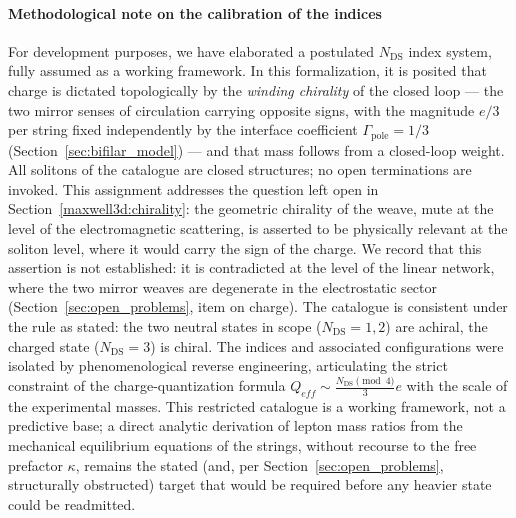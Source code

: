 \documentclass[11pt,a4paper]{article}
\theoremstyle{plain}
\theoremstyle{remark}
\newcommand{\Ncd}{\ensuremath{N_{\mathrm{DS}}}}
\begin{document}
\paragraph{Methodological note on the calibration of the indices}
For development purposes, we have elaborated a postulated $\Ncd$ index system, fully assumed as a working framework. In this formalization, it is posited that charge is dictated topologically by the \emph{winding chirality} of the closed loop --- the two mirror senses of circulation carrying opposite signs, with the magnitude $e/3$ per string fixed independently by the interface coefficient $\Gamma_{\text{pole}} = 1/3$ (Section~\ref{sec:bifilar_model}) --- and that mass follows from a closed-loop weight. All solitons of the catalogue are closed structures; no open terminations are invoked. This assignment addresses the question left open in Section~\ref{maxwell3d:chirality}: the geometric chirality of the weave, mute at the level of the electromagnetic scattering, is asserted to be physically relevant at the soliton level, where it would carry the sign of the charge. We record that this assertion is not established: it is contradicted at the level of the linear network, where the two mirror weaves are degenerate in the electrostatic sector (Section~\ref{sec:open_problems}, item on charge). The catalogue is consistent under the rule as stated: the two neutral states in scope ($\Ncd = 1, 2$) are achiral, the charged state ($\Ncd = 3$) is chiral. The indices and associated configurations were isolated by phenomenological reverse engineering, articulating the strict constraint of the charge-quantization formula $Q_{eff} \sim \frac{\Ncd \pmod 4}{3}e$ with the scale of the experimental masses. This restricted catalogue is a working framework, not a predictive base; a direct analytic derivation of lepton mass ratios from the mechanical equilibrium equations of the strings, without recourse to the free prefactor $\kappa$, remains the stated (and, per Section~\ref{sec:open_problems}, structurally obstructed) target that would be required before any heavier state could be readmitted.
\end{document}
